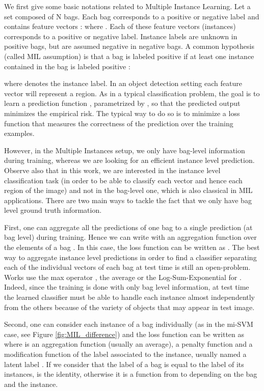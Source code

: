 \documentclass[preprint]{elsarticle}
\begin{document}
We first give some basic notations related to Multiple Instance Learning. 
Let  a set composed of N bags. Each bag  corresponds to a positive or negative label    and  contains  feature  vectors :  where . Each of these feature vectors (instances) corresponds to a positive or negative label. Instance labels are unknown in positive bags, but are assumed negative in negative bags. A common hypothesis (called MIL assumption) is that a bag is labeled positive if at least one instance contained in the bag is labeled positive :

where  denotes the instance label. In an object detection setting each feature vector will represent a region. As in a typical classification problem, the goal is to learn a prediction function , parametrized by , so that the predicted output  minimizes the empirical risk.
The typical way to do so is to minimize a loss function that measures the correctness of the prediction over the training examples. 

However, in the Multiple Instances setup, we only have bag-level information during training,  whereas we are looking for an efficient instance level prediction. Observe also that in this work, we are interested in the instance level classification task (in order  to be able to classify each vector and hence each region of the image) and not in the bag-level one, which is also classical in MIL applications. 
There are two main ways to tackle the fact that we only have bag level ground truth information.

First, one can aggregate all the predictions of one bag to a single prediction (at bag level) during training.
Hence we can write  with  an aggregation function over the elements of a bag . In this case, the loss function can be written as .
The best way to aggregate instance level predictions in order to find a classifier separating each of the individual vectors  of each bag at test time is still an open-problem. Works use the max operator \cite{zhou_neural_2002}, the average or the Log-Sum-Exponential \cite{ramon_multi_2000} for . Indeed, since the training is done with only bag level information, at test time the learned classifier must be able to handle each instance almost independently from the others because of the variety of objects that may appear in test image. 

Second, one can consider each instance of a bag individually (as in the mi-SVM case, see Figure \ref{fig:MIL_difference}) and the loss function can be written as  where  is an aggregation function (usually an average),  a penalty function and  a modification function of the label associated to the instance, usually named a latent label \cite{felzenszwalb_object_2010}. If we consider that the label of a bag is equal to the label of its instances,  is the identity, otherwise it is a function from  to  depending on the bag and the instance. 
\end{document}

